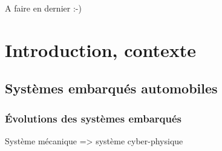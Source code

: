 \documentclass[french, a4paper, 11pt, twoside]{StyleThese}
\begin{document}


    \makeflyleaf

 \cleardoublepage

\dominitoc


 \cleardoublepage

%
%

A faire en dernier :-) 

\tableofcontents

\printnomenclature
%

\mainmatter

\chapter{Introduction, contexte}
    \section{Systèmes embarqués automobiles}
        \subsection{Évolutions des systèmes embarqués}
            Système mécanique => système cyber-physique
\end{document}
